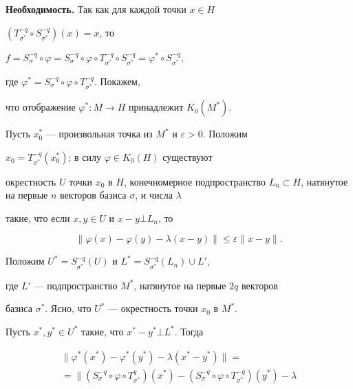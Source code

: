 \begin{pf} 


{\bf Необходимость.} Так как для каждой точки $x\in H$ \ 


$(T^{-q}_{\sigma^*}\circ S^{-q}_{\sigma^*})(x)=x$, то 


$f=S^{-q}_\sigma\circ\varphi= S^{-q}_\sigma\circ\varphi\circ 


T^{-q}_{\sigma^*}\circ S^{-q}_{\sigma^*}=\varphi^*\circ S^{-q}_{\sigma^*}$, 


где $\varphi^*=S^{-q}_\sigma\circ\varphi\circ T^{-q}_{\sigma^*}$. Покажем, 


что отображение $\varphi^*:M\to H$ принадлежит $K_0(M^*)$. 


 


Пусть $x^*_0$ --- произвольная точка из $M^*$ и $\varepsilon>0$. Положим 


$x_0=T^{-q}_{\sigma^*}(x^*_0)$; в силу $\varphi\in K_0(H)$ существуют 


окрестность $U$ точки $x_0$ в $H$, конечномерное подпространство $L_n\subset 


H$, натянутое на первые $n$ векторов базиса $\sigma$, и числа $\lambda$ 


такие, что если $x,y\in U$ и $x-y\bot L_n$, то 


\begin{equation} 


\|\varphi(x)-\varphi(y)-\lambda(x-y)\|\le\varepsilon\|x-y\|. 


\end{equation} 


 


Положим $U^*=S^{-q}_{\sigma^*}(U)$ и $L^*=S^{-q}_{\sigma^*}(L_n)\cup L'$, 


где $L'$ --- подпространство $M^*$, натянутое на первые $2q$ векторов 


базиса $\sigma^*$. Ясно, что $U^*$ --- окрестность точки $x_0$ в $M^*$. 


Пусть $x^*,y^*\in U^*$ такие, что $x^*-y^*\bot L^*$. Тогда 


\begin{gather*} 


\|\varphi^*(x^*)-\varphi^*(y^*)-\lambda(x^*-y^*)\|= \\ 


% 


=\|(S^{-q}_\sigma\circ\varphi\circ T^q_{\sigma^*})(x^*)- 


(S^{-q}_\sigma\circ\varphi\circ T^{-q}_{\sigma^*})(y^*)-\lambda 



\end{gather*}
\end{pf}
